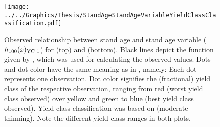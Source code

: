 \begin{figure}[t]
  \texttt{[image: ../../Graphics/Thesis/StandAgeStandAgeVariableYieldClassClassification.pdf]}
  \caption{Observed relationship between stand age and stand age variable (\(h_{100}(x)_{\text{YC 1}}{}\)) for \Beech{} (top) and \Spruce{} (bottom).  Black lines depict the function given by , which was used for calculating the observed values.  Dots and dot color have the same meaning as in , namely:  Each dot represents one observation.  Dot color signifies the (fractional) yield class of the respective observation, ranging from red (worst yield class observed) over yellow and green to blue (best yield class observed).  Yield class classification was based on \textcite{Schober1995} (moderate thinning).  Note the different yield class ranges in both plots.}
  \label{fig:StandAgeStandAgeVariableYieldClassClassification}
\end{figure}

